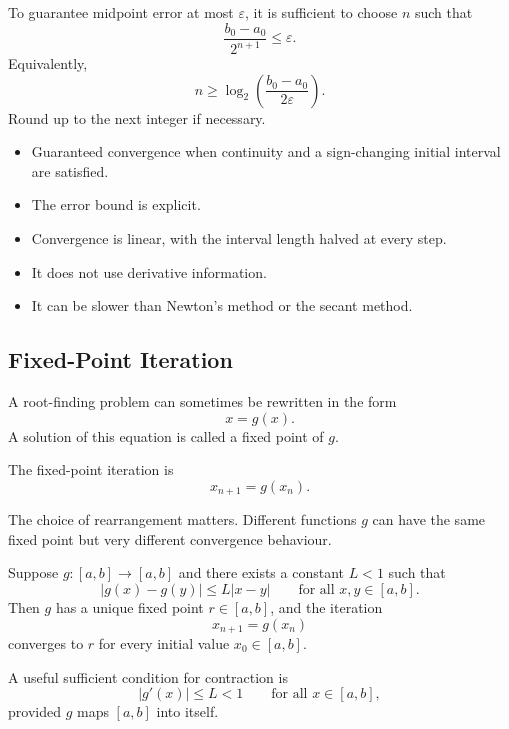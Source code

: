 To guarantee midpoint error at most \(\varepsilon\), it is sufficient to choose \(n\) such that
\[
  \frac{b_0-a_0}{2^{n+1}}\leq\varepsilon.
\]
Equivalently,
\[
  \boxed{
    n\geq
    \log_2\left(\frac{b_0-a_0}{2\varepsilon}\right).
  }
\]
Round up to the next integer if necessary.

\begin{remark}
  \begin{itemize} \emph{}
    \item Guaranteed convergence when continuity and a sign-changing initial interval are satisfied.
    \item The error bound is explicit.
    \item Convergence is linear, with the interval length halved at every step.
    \item It does not use derivative information.
    \item It can be slower than Newton's method or the secant method.
  \end{itemize}
\end{remark}

\subsection{Fixed-Point Iteration}

A root-finding problem can sometimes be rewritten in the form
\[
  x=g(x).
\]
A solution of this equation is called a fixed point of \(g\).

The fixed-point iteration is
\[
  \boxed{x_{n+1}=g(x_n).}
\]

\begin{remark}
  The choice of rearrangement matters. Different functions \(g\) can have the same fixed point but very different convergence behaviour.
\end{remark}

\begin{theorem}
  Suppose \(g:[a,b]\to[a,b]\) and there exists a constant \(L<1\) such that
  \[
    |g(x)-g(y)|\leq L|x-y|
    \qquad \text{for all }x,y\in[a,b].
  \]
  Then \(g\) has a unique fixed point \(r\in[a,b]\), and the iteration
  \[
    x_{n+1}=g(x_n)
  \]
  converges to \(r\) for every initial value \(x_0\in[a,b]\).
\end{theorem}

A useful sufficient condition for contraction is
\[
  |g'(x)|\leq L<1
  \qquad\text{for all }x\in[a,b],
\]
provided \(g\) maps \([a,b]\) into itself.

